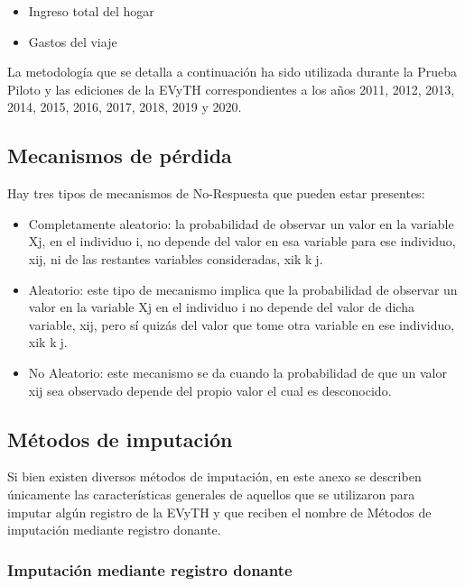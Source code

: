\documentclass[
  openany]{book}
\begin{document}
\begin{itemize}
\item
  Ingreso total del hogar
\item
  Gastos del viaje
\end{itemize}

La metodología que se detalla a continuación ha sido utilizada durante la Prueba Piloto y las ediciones de la EVyTH correspondientes a los años 2011, 2012, 2013, 2014, 2015, 2016, 2017, 2018, 2019 y 2020.

\hypertarget{mecanismos-de-puxe9rdida}{%
\subsection{Mecanismos de pérdida}\label{mecanismos-de-puxe9rdida}}

Hay tres tipos de mecanismos de No-Respuesta que pueden estar presentes:

\begin{itemize}
\item
  Completamente aleatorio: la probabilidad de observar un valor en la variable Xj, en el individuo i, no depende del valor en esa variable para ese individuo, xij, ni de las restantes variables consideradas, xik kj.
\item
  Aleatorio: este tipo de mecanismo implica que la probabilidad de observar un valor en la variable Xj en el individuo i no depende del valor de dicha variable, xij, pero sí quizás del valor que tome otra variable en ese individuo, xik kj.
\item
  No Aleatorio: este mecanismo se da cuando la probabilidad de que un valor xij sea observado depende del propio valor el cual es desconocido.
\end{itemize}

\hypertarget{muxe9todos-de-imputaciuxf3n}{%
\subsection{Métodos de imputación}\label{muxe9todos-de-imputaciuxf3n}}

Si bien existen diversos métodos de imputación, en este anexo se describen únicamente las características generales de aquellos que se utilizaron para imputar algún registro de la EVyTH y que reciben el nombre de Métodos de imputación mediante registro donante.

\hypertarget{imputaciuxf3n-mediante-registro-donante}{%
\subsubsection{Imputación mediante registro donante}\label{imputaciuxf3n-mediante-registro-donante}}
\end{document}
